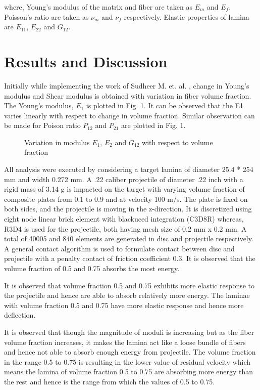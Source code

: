 \documentclass[a4paper,11pt, hidelinks]{article}
\begin{document}
where,  Young’s modulus of the matrix and fiber are taken as $E_m$ and $E_f$. Poisson’s ratio are taken as $\nu_m$ and $\nu_f$ respectively. Elastic properties of lamina are $E_{11}$, $E_{22}$ and $G_{12}$.

\section{Results and Discussion}
Initially while implementing the work of Sudheer M. et. al. \cite{Sudheer2015}, change in Young’s modulus and Shear modulus is obtained with variation in fiber volume fraction. The Young’s modulus, $E_1$ is plotted in Fig. 1. It can be observed that the E1 varies linearly with respect to change in volume fraction. Similar observation can be made for Poison ratio $P_{12}$ and $P_{21}$ are plotted in Fig. 1.

\begin{figure}[h]
  \centering
  
  \caption{Variation in modulus $E_1$, $E_2$ and $G_{12}$ with respect to volume fraction}
\end{figure}


All analysis were executed by considering a target lamina of diameter 25.4 * 254 mm and width 0.272 mm. A .22 caliber projectile of diameter .22 inch with a rigid mass of 3.14 g is impacted on the target with varying volume fraction of composite plates from 0.1 to 0.9 and at velocity 100 m/s. The plate is fixed on both sides, and the projectile is moving in the z-direction. It is discretized using eight node linear brick element with blackuced integration (C3D8R) whereas, R3D4 is used for the projectile, both having mesh size of 0.2 mm x 0.2 mm. A total of 40005 and 840 elements are generated in disc and projectile respectively. A general contact algorithm is used to formulate contact between disc and projectile with a penalty contact of friction coefficient 0.3. It is observed that the volume fraction of 0.5 and 0.75 absorbs the most energy.
	
It is observed that volume fraction 0.5 and 0.75 exhibits more elastic response to the projectile and hence are able to absorb relatively more energy. The laminae with volume fraction 0.5 and 0.75 have more elastic response and hence more deflection.

It is observed that though the magnitude of moduli is increasing but as the fiber volume fraction increases, it makes the lamina act like a loose bundle of fibers and hence not able to absorb enough energy from projectile. The volume fraction in the range 0.5 to 0.75 is resulting in the lower value of residual velocity which means the lamina of volume fraction 0.5 to 0.75 are absorbing more energy than the rest and hence is the range from which the values of 0.5 to 0.75.
\end{document}
